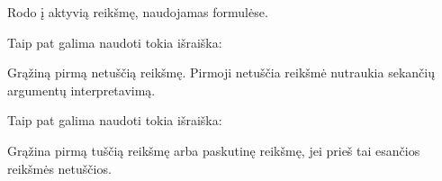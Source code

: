 \documentclass[letterpaper,10pt,lithuanian]{sphinxmanual}
\begin{document}

\begin{fulllineitems}
\label{\detokenize{formules:func.self}}
\pysigstartsignatures
{}
\pysigstopsignatures
\sphinxAtStartPar
Rodo į aktyvią reikšmę, naudojamas {\hyperref[\detokenize{dimensijos:property.prepare}]{}} formulėse.

\end{fulllineitems}


\begin{fulllineitems}
\label{\detokenize{formules:func.or}}
\pysigstartsignatures
{}
\pysigstopsignatures
\sphinxAtStartPar
Taip pat galima naudoti tokia išraiška:

\begin{sphinxVerbatim}[commandchars=\\\{\}]
    
\end{sphinxVerbatim}

\sphinxAtStartPar
Grąžiną pirmą netuščią reikšmę. Pirmoji netuščia reikšmė nutraukia sekančių
 argumentų interpretavimą.

\end{fulllineitems}


\begin{fulllineitems}
\label{\detokenize{formules:func.and}}
\pysigstartsignatures
{}
\pysigstopsignatures
\sphinxAtStartPar
Taip pat galima naudoti tokia išraiška:

\begin{sphinxVerbatim}[commandchars=\\\{\}]
    
\end{sphinxVerbatim}

\sphinxAtStartPar
Grąžina pirmą tuščią reikšmę arba paskutinę reikšmę, jei prieš tai esančios
reikšmės netuščios.

\end{fulllineitems}
\end{document}
